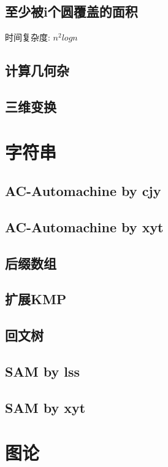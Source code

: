 \documentclass[11pt]{article}
\begin{document}
		\subsection{至少被i个圆覆盖的面积}
		时间复杂度: $n^2logn$
		
		\subsection{计算几何杂}
		
		\subsection{三维变换}
		
	\section{字符串}
		\subsection{AC-Automachine by cjy}
		
		\subsection{AC-Automachine by xyt}
		
		\subsection{后缀数组}
		
		\subsection{扩展KMP}
		
		\subsection{回文树}
		
		\subsection{SAM by lss}
		
		\subsection{SAM by xyt}
		
	\section{图论}
\end{document}
